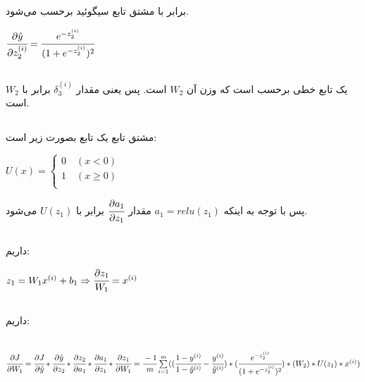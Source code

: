 \documentclass[a4paper,14pt]{extarticle}
\begin{document}
\subsection{}
برابر با مشتق تابع سیگوئید برحسب 
می‌شود. 
\begin{latin}
	$
	\cfrac{\partial \hat{y}}{\partial z_2^{(i)}} = \cfrac{e^{-z_2^{(i)}}}{(1 + e^{-z_2^{(i)}})^2}
	$
\end{latin}
\subsection{}
یک تابع خطی برحسب 
است که وزن آن 
$W_2$
است. پس یعنی مقدار 
$\delta_3^{(i)}$
برابر با 
$W_2$
است.
\subsection{}
مشتق تابع 
یک تابع بصورت زیر است:
\begin{latin}
	$
	U(x) = \left\{
	\begin{array}{ll}
	0 \quad  (x < 0) \\
	1 \quad  (x \geq 0) \\
		\end{array}
	\right.
	$
\end{latin}
پس با توجه به اینکه
$
a_1 = relu(z_1)
$
مقدار 
$
\cfrac{\partial a_1}{\partial z_1}
$
برابر با 
$U(z_1)$
می‌شود.
\subsection{}
داریم:

\begin{latin}
	$
	z_1 = W_1 x^{(i)} + b_1 \Rightarrow \cfrac{\partial z_1}{W_1} = x^{(i)}
	$
\end{latin}
\subsection{}
داریم:
\begin{latin}
	~\\
	$
	\cfrac{\partial J}{\partial W_1} = \cfrac{\partial J}{\partial \hat{y}} * \cfrac{\partial \hat{y}}{\partial z_2} * \cfrac{\partial z_2}{\partial a_1} *
	\cfrac{\partial a_1}{\partial z_1} * \cfrac{\partial z_1}{\partial W_1} 
	\\
	= 
	\cfrac{-1}{m} \sum\limits_{i = 1}^m ((\cfrac{1 - y^{(i)}}{1 - \hat{y}^{(i)}} - \cfrac{y^{(i)}}{\hat{y}^{(i)}}) * ( \cfrac{e^{-z_2^{(i)}}}{(1 + e^{-z_2^{(i)}})^2} ) * ( W_2 ) * U(z_1) * x^{(i)} ) 
	$
\end{latin}
\end{document}
